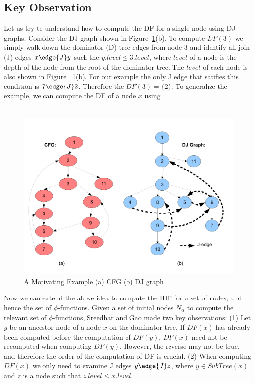 \subsection{Key Observation} 
 
Let us try to understand how to compute the DF for a single node using DJ graphs. 
Consider  the DJ graph shown in Figure~\ref{fig:cfg}(b). To compute $DF(3)$ we simply walk down the
dominator (D) tree edges from node 3 and identify all join (J) edges $x \edge{J} y$ such
the $y.level \leq 3.level$, where $level$ of a node is the depth of the node from the
root of the dominator tree. The $level$ of each node is also shown in Figure ~\ref{fig:cfg}(b).
For our example the only J edge that satifies this 
condition is $7 \edge{J} 2$. Therefore the $DF(3) = \{2\}$. To generalize the example, we can
compute the DF of a node $x$ using \\
\\

    \begin{figure}[htb]
    \centerline{\includegraphics[scale=0.4]{cfglive.pdf}}
    \caption{A Motivating Example (a) CFG (b) DJ graph}
    \label{fig:cfg}
    \end{figure} 

Now we can extend the above idea to compute the IDF for a set of nodes, and hence
the set of $\phi$-functions. Given a set of initial nodes $N_{\alpha}$ to compute the 
relevant set of $\phi$-functions,
Sreedhar and Gao  made two key observations: (1) Let $y$ be an ancestor node of a node $x$ 
on the dominator tree. If $DF(x)$ has
already been computed before the computation of $DF(y)$,  $DF(x)$ need not
be recomputed when computing $DF(y)$. However, the reverse may not be
true, and  therefore the order of the computation of DF is crucial. 
(2) When computing $DF(x)$ we only need to examine J edges $y\edge{J} z$, where $y \in SubTree(x)$
and $z$ is a node such that $z.level \leq x.level$.


